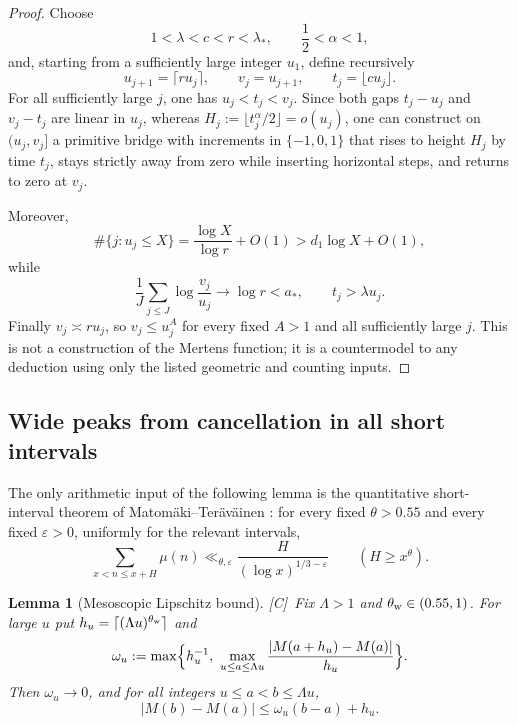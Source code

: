 \documentclass[11pt,reqno]{amsart}
\numberwithin{equation}{section}
\theoremstyle{plain}
\newtheorem{lemma}[theorem]{Lemma}
\theoremstyle{definition}
\theoremstyle{remark}
\newcommand{\tagC}{\textup{[C]}}
\begin{document}
\begin{proof}
Choose
\begin{equation}
1<\lambda<c<r<\lambda_*,\qquad \frac12<\alpha<1,
\end{equation}
and, starting from a sufficiently large integer $u_1$, define recursively
\begin{equation}
u_{j+1}=\lceil r u_j\rceil,\qquad
v_j=u_{j+1},\qquad
t_j=\lfloor c u_j\rfloor.
\end{equation}
For all sufficiently large $j$, one has $u_j<t_j<v_j$.  Since both gaps
$t_j-u_j$ and $v_j-t_j$ are linear in $u_j$, whereas
$H_j:=\lfloor t_j^\alpha/2\rfloor=o(u_j)$, one can construct on
$(u_j,v_j]$ a primitive bridge with increments in $\{-1,0,1\}$ that rises to
height $H_j$ by time $t_j$, stays strictly away from zero while inserting
horizontal steps, and returns to zero at $v_j$.

Moreover,
\begin{equation}
\#\{j:u_j\le X\}=\frac{\log X}{\log r}+O(1)>d_1\log X+O(1),
\end{equation}
while
\begin{equation}
\frac1J\sum_{j\le J}\log\frac{v_j}{u_j}\longrightarrow\log r<a_*,
\qquad
t_j>\lambda u_j.
\end{equation}
Finally $v_j\asymp r u_j$, so $v_j\le u_j^A$ for every fixed $A>1$ and all
sufficiently large $j$.  This is not a construction of the Mertens function;
it is a countermodel to any deduction using only the listed geometric and
counting inputs.
\end{proof}

\subsection{Wide peaks from cancellation in all short intervals}
\label{subsec:wide-peaks}

The only arithmetic input of the following lemma is the quantitative short-interval theorem of
Matom\"aki--Ter\"av\"ainen \cite[Theorem~1.1]{MatomakiTeravainen2023}: for every fixed
$\theta>0.55$ and every fixed $\varepsilon>0$, uniformly for the relevant intervals,
\begin{equation}
 \sum_{x<n\le x+H}\mu(n)
 \ll_{\theta,\varepsilon} \frac{H}{(\log x)^{1/3-\varepsilon}}
 \qquad(H\ge x^\theta).
\end{equation}

\begin{lemma}[Mesoscopic Lipschitz bound]
\label{lem:meso-lipschitz}
\tagC\ Fix $\Lambda>1$ and $\theta_{\rm w}\in(0.55,1)$. For large $u$ put
$h_u=\lceil(\Lambda u)^{\theta_{\rm w}}\rceil$ and
\begin{equation}
\omega_u:=\max\Bigl\{h_u^{-1},\ \max_{u\le a\le\Lambda u}
\frac{|M(a+h_u)-M(a)|}{h_u}\Bigr\}.
\end{equation}
Then $\omega_u\to0$, and for all integers $u\le a<b\le\Lambda u$,
\begin{equation}
\label{eq:meso-lipschitz}
|M(b)-M(a)|\le\omega_u(b-a)+h_u .
\end{equation}
\end{lemma}
\end{document}
